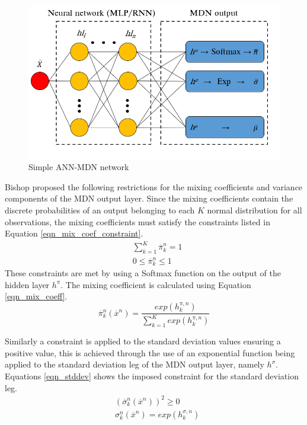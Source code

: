 \documentclass[a4paper,fleqn]{cas-dc}
\begin{document}
\begin{figure}[h!]
	\centering
		\includegraphics[scale=0.5]{MDN_SCHEMATIC}
	  \caption{Simple ANN-MDN network}\label{fig_mdn_schematic}
\end{figure}

Bishop \cite{bishop1994} proposed the following restrictions for the mixing coefficients and variance components of the MDN output layer. Since the mixing coefficients contain the discrete probabilities of an output belonging to each $K$ normal distribution for all observations, the mixing coefficients must satisfy the constraints listed in Equation \ref{eqn_mix_coef_constraint}.
\begin{equation}\label{eqn_mix_coef_constraint}
\begin{split}
&\sum_{k=1}^K\overline{\pi}_k^n=1\\
&0\leq\overline{\pi}_k^n\leq1
\end{split}
\end{equation}
These constraints are met by using a Softmax function on the output of the hidden layer $h^{\pi}$. The mixing coefficient is calculated using Equation \ref{eqn_mix_coeff}.
\begin{equation}\label{eqn_mix_coeff}
\overline{\pi}_k^n(\overline{x}^n)=\frac{exp(h_k^{\pi,n})}{\sum_{k=1}^Kexp(h_k^{\pi,n})}
\end{equation}

Similarly a constraint is applied to the standard deviation values ensuring a positive value, this is achieved through the use of an exponential function being applied to the standard deviation leg of the MDN output layer, namely $h^{\sigma}$. Equations \ref{eqn_stddev} shows the imposed constraint for the standard deviation leg.\\
\begin{equation}\label{eqn_stddev}
\begin{split}
&(\overline{\sigma}^n_k(\overline{x}^n))^2\geq 0\\
&\sigma_k^n(\overline{x}^n)=exp(h_k^{\sigma,n})
\end{split}
\end{equation}
\end{document}
